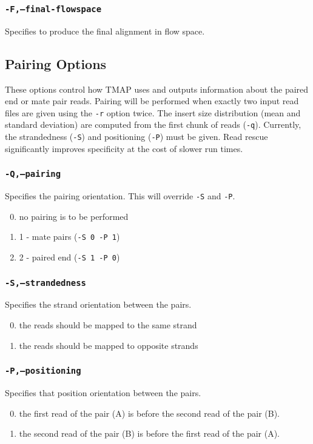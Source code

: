 \documentclass[a4paper,12pt]{book}
\newcommand{\TT}[1]{{\tt #1}} %
\begin{document}
\subsubsection{\TT{-F,--final-flowspace}}
Specifies to produce the final alignment in flow space.

\subsection{Pairing Options}
These options control how TMAP uses and outputs information about the paired end or mate pair reads.
Pairing will be performed when exactly two input read files are given using the \TT{-r} option twice.
The insert size distribution (mean and standard deviation) are computed from the first chunk of reads (\TT{-q}).
Currently, the strandedness (\TT{-S}) and positioning (\TT{-P}) must be given.
Read rescue significantly improves specificity at the cost of slower run times.

\subsubsection{\TT{-Q,--pairing}}
Specifies the pairing orientation.
This will override \TT{-S} and \TT{-P}.
\begin{enumerate}
	\setcounter{enumi}{-1} %
	\item no pairing is to be performed
	\item 1 - mate pairs (\TT{-S 0 -P 1})
	\item 2 - paired end (\TT{-S 1 -P 0})
\end{enumerate}

\subsubsection{\TT{-S,--strandedness}}
Specifies the strand orientation between the pairs.
\begin{enumerate}
	\setcounter{enumi}{-1} %
	\item the reads should be mapped to the same strand
	\item the reads should be mapped to opposite strands
\end{enumerate}

\subsubsection{\TT{-P,--positioning}}
Specifies that position orientation between the pairs.
\begin{enumerate}
	\setcounter{enumi}{-1} %
	\item the first read of the pair (A) is before the second read of the pair (B).
	\item the second read of the pair (B) is before the first read of the pair (A).
\end{enumerate}
\end{document}
